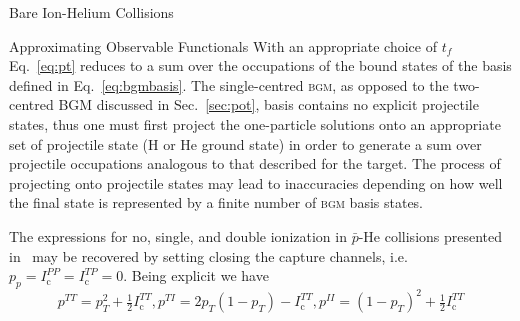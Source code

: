 \documentclass[letterpaper, 11 pt]{report}
\begin{document}
\begin{chapter}{Bare Ion-Helium Collisions \label{chap:p-he2p-he}}
\begin{section}{Approximating Observable Functionals \label{sec:phe2p-obs}}
      With an appropriate choice of $t_f$ Eq.~\eqref{eq:pt} reduces to a sum over the occupations of the
      bound states of the basis defined in Eq.~\eqref{eq:bgmbasis}. The single-centred \textsc{bgm}, as
      opposed to the two-centred \textsc{BGM} discussed in Sec.~\ref{sec:pot}, basis contains no
      explicit projectile states, thus one must first project the one-particle solutions onto an
      appropriate set of projectile state (H or He ground state) in order to generate a sum over
      projectile occupations analogous to that described for the target. The process of projecting onto
      projectile states may lead to inaccuracies depending on how well the final state is represented by
      a finite number of \textsc{bgm} basis states.

      The expressions for no, single, and double ionization in $\bar{p}$-He collisions presented
      in~\cite{pbarhe} may be recovered by setting closing the capture channels, i.e.\
      $p_p = I^{PP}_\mathrm{c} = I^{TP}_\mathrm{c} = 0$. Being explicit we have
      \begin{subequations} \label{eq:prob-pbarhe}
         \begin{equation} \label{eq:ptt-pbarhe}
            p^{TT} = p_T^2 + \tfrac{1}{2} I^{TT}_\mathrm{c},
         \end{equation}
         \begin{equation} \label{eq:pti-pbarhe}
            p^{TI} = 2p_T(1 - p_T) - I^{TT}_\mathrm{c},
         \end{equation}
         \begin{equation} \label{eq:pii-pbarhe}
            p^{II} = (1 - p_T)^2 + \tfrac{1}{2} I^{TT}_\mathrm{c}
         \end{equation}
      \end{subequations}


\end{section}
\end{chapter}
\end{document}
